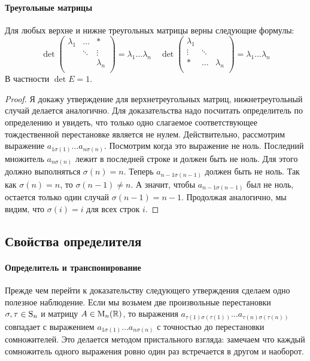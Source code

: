 \paragraph{Треугольные матрицы}

\begin{claim}\label{claim::DetUpperTr}
Для любых верхне и нижне треугольных матрицы верны следующие формулы:
\[
\det
\begin{pmatrix}
{\lambda_1}&{\ldots}&{*}\\
{}&{\ddots}&{\vdots}\\
{}&{}&{\lambda_n}\\
\end{pmatrix}
 = 
\lambda_1 \ldots \lambda_n
\quad
\det
\begin{pmatrix}
{\lambda_1}&{}&{}\\
{\vdots}&{\ddots}&{}\\
{*}&{\ldots}&{\lambda_n}\\
\end{pmatrix}
 = 
 \lambda_1 \ldots \lambda_n
\]
В частности $\det E = 1$.
\end{claim}
\begin{proof}
Я докажу утверждение для верхнетреугольных матриц, нижнетреугольный случай делается аналогично.
Для доказательства надо посчитать определитель по определению и увидеть, что только одно слагаемое соответствующее тождественной перестановке является не нулем.
Действительно, рассмотрим выражение $a_{1\sigma(1)}\ldots a_{n\sigma(n)}$.
Посмотрим когда это выражение не ноль.
Последний множитель $a_{n\sigma(n)}$ лежит в последней строке и должен быть не ноль.
Для этого должно выполняться $\sigma(n) = n$.
Теперь $a_{n-1\sigma(n-1)}$ должен быть не ноль.
Так как $\sigma(n) = n$, то $\sigma(n - 1)\neq n$.
А значит, чтобы $a_{n-1 \sigma(n-1)}$ был не ноль, остается только один случай $\sigma(n-1) = n-1$.
Продолжая аналогично, мы видим, что $\sigma(i) = i$ для всех строк $i$.
\end{proof}

\subsection{Свойства определителя}

\paragraph{Определитель и транспонирование}

Прежде чем перейти к доказательству следующего утверждения сделаем одно полезное наблюдение.
Если мы возьмем две произвольные перестановки $\sigma,\tau\in\operatorname{S}_{n}$ и матрицу $A\in\operatorname{M}_{n}(\mathbb R)$, то выражения $a_{\tau(1) \sigma(\tau (1))}\ldots a_{\tau(n) \sigma(\tau(n))}$ совпадает с выражением $a_{1\sigma(1)}\ldots a_{n\sigma(n)}$ с точностью до перестановки сомножителей.
Это делается методом пристального взгляда: замечаем что каждый сомножитель одного выражения ровно один раз встречается в другом и наоборот.

